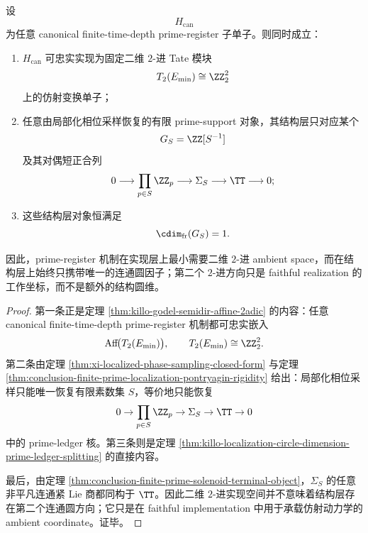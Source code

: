 \begin{theorem}[实现层二维与结构层一圆维的严格分离]\label{thm:conclusion-prime-register-twoadic-implementation-onecircle-structure-separation}
设
\[
H_{\mathrm{can}}
\]
为任意 canonical finite-time-depth prime-register 子单子。则同时成立：
\begin{enumerate}
  \item \(H_{\mathrm{can}}\) 可忠实实现为固定二维 \(2\)-进 Tate 模块
  \[
  T_2(E_{\min})\cong \ZZ_2^2
  \]
  上的仿射变换单子；
  \item 任意由局部化相位采样恢复的有限 prime-support 对象，其结构层只对应某个
  \[
  G_S=\ZZ[S^{-1}]
  \]
  及其对偶短正合列
  \[
  0\longrightarrow \prod_{p\in S}\ZZ_p\longrightarrow \Sigma_S\longrightarrow \TT\longrightarrow 0;
  \]
  \item 这些结构层对象恒满足
  \[
  \cdim_{\mathrm{fr}}(G_S)=1.
  \]
\end{enumerate}
因此，prime-register 机制在实现层上最小需要二维 \(2\)-进 ambient space，而在结构层上始终只携带唯一的连通圆因子；第二个 \(2\)-进方向只是 faithful realization 的工作坐标，而不是额外的结构圆维。
\end{theorem}
\begin{proof}
第一条正是定理 \ref{thm:killo-godel-semidir-affine-2adic} 的内容：任意 canonical finite-time-depth prime-register 机制都可忠实嵌入
\[
\mathrm{Aff}\!\bigl(T_2(E_{\min})\bigr),
\qquad
T_2(E_{\min})\cong \ZZ_2^2.
\]
第二条由定理 \ref{thm:xi-localized-phase-sampling-closed-form} 与定理 \ref{thm:conclusion-finite-prime-localization-pontryagin-rigidity} 给出：局部化相位采样只能唯一恢复有限素数集 \(S\)，等价地只能恢复
\[
0\to \prod_{p\in S}\ZZ_p\to \Sigma_S\to \TT\to 0
\]
中的 prime-ledger 核。第三条则是定理 \ref{thm:killo-localization-circle-dimension-prime-ledger-splitting} 的直接内容。

最后，由定理 \ref{thm:conclusion-finite-prime-solenoid-terminal-object}，\(\Sigma_S\) 的任意非平凡连通紧 Lie 商都同构于 \(\TT\)。因此二维 \(2\)-进实现空间并不意味着结构层存在第二个连通圆方向；它只是在 faithful implementation 中用于承载仿射动力学的 ambient coordinate。证毕。
\end{proof}


